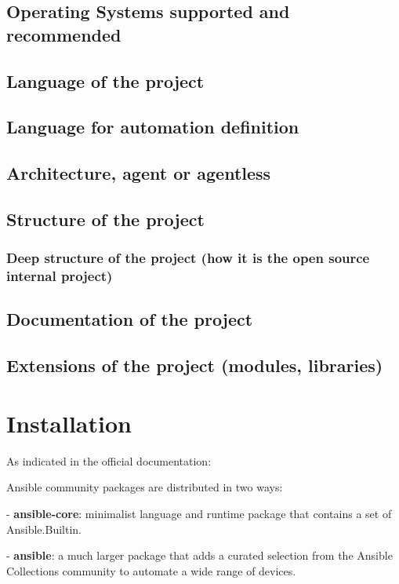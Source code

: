 \documentclass[12pt,a4paper,openright,twoside]{book}
\begin{document}
\subsection{Operating Systems supported and recommended}

\subsection{Language of the project}

\subsection{Language for automation definition}

\subsection{Architecture, agent or agentless}

\subsection{Structure of the project}

\subsubsection{Deep structure of the project (how it is the open source internal project)}

\subsection{Documentation of the project}

\subsection{Extensions of the project (modules, libraries)}

\section{Installation}
As indicated in the official documentation\cite{ansibleDocInstall}:

Ansible community packages are distributed in two ways:

- \textbf{ansible-core}: minimalist language and runtime package that contains a set of Ansible.Builtin.

- \textbf{ansible}: a much larger package that adds a curated selection from the Ansible Collections community to automate a wide range of devices.
\end{document}
